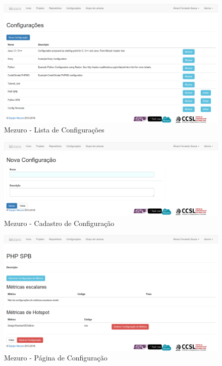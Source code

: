 \begin{figure}[!htb]
	\centering
    \includegraphics[keepaspectratio=true,scale=0.3]
    {figuras/mezuro-configuracoes.eps}
  \caption{Mezuro - Lista de Configurações}
	\label{fig:mezuro-configuracoes}
\end{figure}

\begin{figure}[!htb]
	\centering
    \includegraphics[keepaspectratio=true,scale=0.3]
    {figuras/mezuro-configuracao-cadastro.eps}
  \caption{Mezuro - Cadastro de Configuração}
	\label{fig:mezuro-configuracao-cadastro}
\end{figure}

\newpage

\begin{figure}[!htb]
	\centering
    \includegraphics[keepaspectratio=true,scale=0.3]
    {figuras/mezuro-configuracao-view.eps}
  \caption{Mezuro - Página de Configuração}
	\label{fig:mezuro-configuracao-view}
\end{figure}

